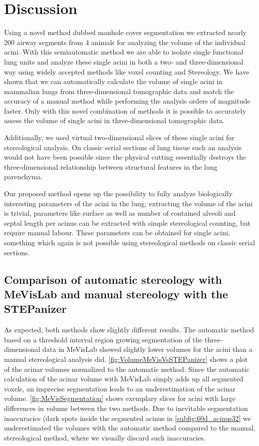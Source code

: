 \documentclass[%
	paper=a4,%
	abstract=true,%
	]{scrartcl}
\begin{document}
\section{Discussion}
Using a novel method dubbed manhole cover segmentation we extracted nearly 200 airway segments from 4 animals for analyzing the volume of the individual acini. With this semiautomatic method we are able to isolate single functional lung units and analyze these single acini in both a two- and three-dimensional way using widely accepted methods like voxel counting and Stereology. We have shown that we can automatically calculate the volume of single acini in mammalian lungs from three-dimensional tomographic data and match the accuracy of a manual method while performing the analysis orders of magnitude faster. Only with this novel combination of methods it is possible to accurately assess the volume of single acini in three-dimensional tomographic data.

Additionally, we used virtual two-dimensional slices of these single acini for stereological analysis. On classic serial sections of lung tissue such an analysis would not have been possible since the physical cutting essentially destroys the three-dimensional relationship between structural features in the lung parenchyma.

Our proposed method opens up the possibility to fully analyze biologically interesting parameters of the acini in the lung; extracting the volume of the acini is trivial, parameters like surface as well as number of contained alveoli and septal length per acinus can be extracted with simple stereological counting, but require manual labour. These parameters can be obtained for single acini, something which again is not possible using stereological methods on classic serial sections.

\subsection[Comparison of MeVisLab with STEPanizer]{Comparison of automatic stereology with MeVisLab and manual stereology with the STEPanizer}
As expected, both methods show slightly different results. The automatic method based on a threshold interval region growing segmentation of the three-dimensional data in MeVisLab showed slightly lower volumes for the acini than a manual stereological analysis did. \autoref{fig:VolumeMeVisVsSTEPanizer} shows a plot of the acinar volumes normalized to the automatic method. Since the automatic calculation of the acinar volume with MeVisLab simply adds up all segmented voxels, an imprecise segmentation leads to an underestimation of the acinar volume. \autoref{fig:MeVisSegmentation} shows exemplary slices for acini with large differences in volume between the two methods. Due to inevitable segmentation inaccuracies (dark spots inside the segmented acinus in \autoref{subfig:60d_acinus32} we underestimated the volumes with the automatic method compared to the manual, stereological method, where we visually discard such inaccuracies.
\end{document}
